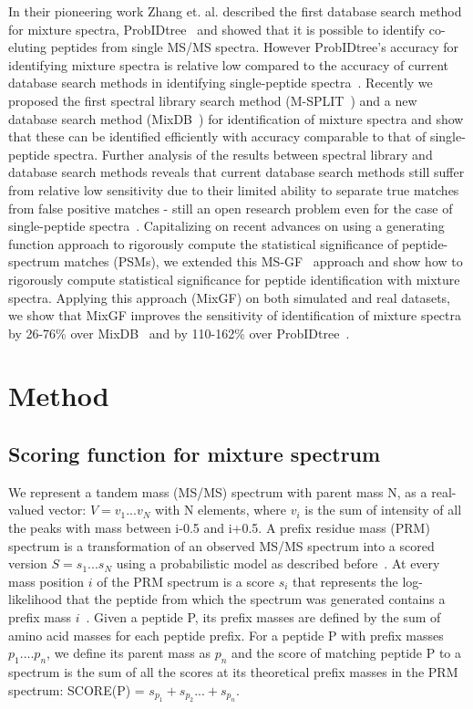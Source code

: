 \documentclass[runningheads,a4paper]{llncs}
\begin{document}
In their pioneering work Zhang et. al. described the first database search method for mixture spectra, ProbIDtree~\cite{zhang2005tree} and showed that it is possible to identify co-eluting peptides from single MS/MS spectra. However ProbIDtree's accuracy for identifying mixture spectra is relative low compared to the accuracy of current database search methods in identifying single-peptide spectra~\cite{wang2011peptide}. Recently we proposed the first spectral library search method (M-SPLIT~\cite{wang2010msplit}) and a new database search method (MixDB~\cite{wang2011peptide}) for identification of mixture spectra and show that these can be identified efficiently with accuracy comparable to that of single-peptide spectra.  Further analysis of the results between  spectral library and database search methods reveals that current database search methods still suffer from relative low sensitivity due to their limited ability to separate true matches from false positive matches - still an open research problem even for the case of single-peptide spectra~\cite{kall2007semi,kim2008spectral,nesvizhskii2010survey}.  Capitalizing on recent advances on using a generating function approach to rigorously compute the statistical significance of peptide-spectrum matches (PSMs), we extended this MS-GF~\cite{kim2008spectral} approach and show how to rigorously compute statistical significance for peptide identification with mixture spectra.  Applying this approach (MixGF) on both simulated and real datasets, we show that MixGF improves the sensitivity of identification of mixture spectra by 26-76\% over MixDB~\cite{wang2011peptide} and by 110-162\% over ProbIDtree~\cite{zhang2005tree}.

\clearpage

\section*{Method}
\subsection*{Scoring function for mixture spectrum}
We represent a tandem mass (MS/MS) spectrum with parent mass N, as a real-valued vector: $V = v_{1} ... v_{N}$ with N elements, where $v_{i}$ is the sum of intensity of all the peaks with mass between i-0.5 and i+0.5. A prefix residue mass (PRM) spectrum is a transformation of an observed MS/MS spectrum into a scored version $S = s_{1} ... s_{N}$ using a probabilistic model as described before~\cite{kim2009}.  At every mass position $i$ of the PRM spectrum is a score $s_{i}$ that represents the log-likelihood that the peptide from which the spectrum was generated contains a prefix mass $i$~\cite{dancik99}. Given a peptide P, its prefix masses are defined by the sum of amino acid masses for each peptide prefix.  For a peptide P with prefix masses $p_{1} .... p_{n}$, we define its parent mass as $p_{n}$ and the score of matching peptide P to a spectrum is the sum of all the scores at its theoretical prefix masses in the PRM spectrum: SCORE(P) = $s_{p_{1}} + s_{p_{2}} ... + s_{p_{n}}$.
\end{document}
